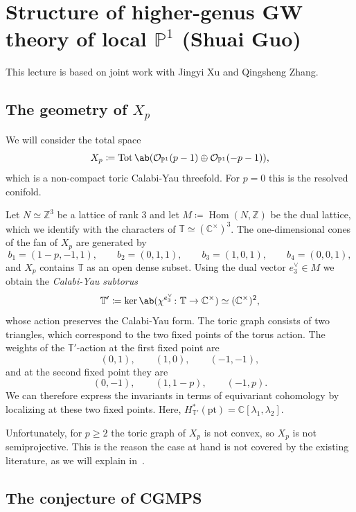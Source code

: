 \documentclass{amsart}
\theoremstyle{definition}
\theoremstyle{remark}
\theoremstyle{plain}
\theoremstyle{definition}
\theoremstyle{remark}
\newcommand{\C}{\mathbb{C}}
\newcommand{\Z}{\mathbb{Z}}
\renewcommand{\P}{\mathbb{P}}
\newcommand{\mc}[1]{\mathcal{#1}}
\newcommand{\T}{\mathbb{T}}
\newcommand{\mr}[1]{\mathrm{#1}}
\newcommand{\on}[1]{\operatorname{#1}}
\newcommand{\1}{\mathbf{1}}
\newcommand{\2}{\mathbf{2}}
\newcommand{\3}{\mathbf{3}}
\DeclareMathOperator{\Hom}{Hom}
\begin{document}
\section{\texorpdfstring{Structure of higher-genus GW theory of local \(\P^1\)}{Structure of higher-genus GW theory of local P1} (Shuai Guo)}%
\label{sec:Structure of higher-genus GW theory of local P1 (Shuai Guo)}

This lecture is based on joint work with Jingyi Xu and Qingsheng Zhang.

\subsection{The geometry of \(X_p\)}%
\label{sub:The geometry of Xp}

We will consider the total space
\[ X_p \coloneqq \on{Tot}\ab(\mc{O}_{\P^1}(p-1) \oplus \mc{O}_{\P^1}(-p-1)), \]
which is a non-compact toric Calabi-Yau threefold. For \(p = 0\) this is the resolved conifold.

Let \(N \simeq \Z^3\) be a lattice of rank \(3\) and let \(M \coloneqq \Hom(N,\Z)\) be the dual lattice, which we identify with the characters of \(\T \simeq (\C^{\times})^3\). The one-dimensional cones of the fan of \(X_p\) are generated by
\[ b_1 = (1-p,-1,1), \qquad b_2 = (0,1,1), \qquad b_3 = (1,0,1), \qquad b_4 = (0,0,1), \]
and \(X_p\) contains \(\T\) as an open dense subset. Using the dual vector \(e_3^{\vee} \in M\) we obtain the \textit{Calabi-Yau subtorus}
\[ \T' \coloneqq \ker\ab(\chi^{e_3^{\vee}} \colon \T \to \C^{\times}) \simeq (\C^{\times})^2, \]
whose action preserves the Calabi-Yau form. The toric graph consists of two triangles, which correspond to the two fixed points of the torus action. The weights of the \(\T'\)-action at the first fixed point are
\[ (0,1), \qquad (1,0), \qquad (-1,-1), \]
and at the second fixed point they are
\[ (0,-1), \qquad (1,1-p), \qquad (-1,p). \]
We can therefore express the invariants in terms of equivariant cohomology by localizing at these two fixed points. Here, \(H^*_{\T'}(\mr{pt}) = \C[\lambda_1,\lambda_2]\).

Unfortunately, for \(p \geq 2\) the toric graph of \(X_p\) is not convex, so \(X_p\) is not semiprojective. This is the reason the case at hand is not covered by the existing literature, as we will explain in~.

\subsection{The conjecture of CGMPS}%
\label{sub:The conjecture of CGMPS}
\end{document}
